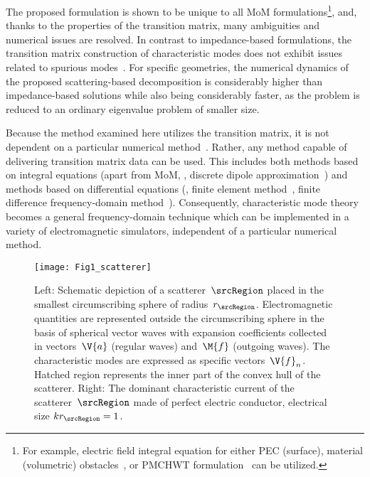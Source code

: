 \documentclass[journal]{IEEEtran}
\providecommand{\aCircum}{r_\srcRegion} %
\begin{document}
The proposed formulation is shown to be unique to all \ac{MoM} formulations\footnote{For example, electric field integral equation for either PEC (surface), material (volumetric) obstacles~\cite{VolakisSertel_IntegralEquationMethodsForElectromagnetics}, or PMCHWT formulation~\cite{1973_Poggio_ComputerTechniquesForElectromagnetics,1977_Wu_RS,ChangHarrington_AsurfaceFormulationForCharacteristicModesOfMaterialBodies} can be utilized.},  and, thanks to the properties of the transition matrix, many ambiguities and numerical issues are resolved. In contrast to impedance-based formulations, the transition matrix construction of characteristic modes does not exhibit issues related to spurious modes~\cite{YlaOijala_PMCHWTBasedCharacteristicModeFormulationsforMaterialBodies}. For specific geometries, the numerical dynamics of the proposed scattering-based decomposition is considerably higher than impedance-based solutions while also being considerably faster, as the problem is reduced to an ordinary eigenvalue problem of smaller size. %

Because the method examined here utilizes the transition matrix, it is not dependent on a particular numerical method~\cite{Mishchenko2020}. Rather, any method capable of delivering transition matrix data can be used. This includes both methods based on integral equations (apart from \ac{MoM}, \eg{}, discrete dipole approximation~\cite{Loke+etal2009}) and methods based on differential equations (\eg{}, finite element method~\cite{Demesy+etal2018,Fruhnert+etal2017}, finite difference frequency-domain method~\cite{Loke+etal2007}). Consequently, characteristic mode theory becomes a general frequency-domain technique which can be implemented in a variety of electromagnetic simulators, independent of a particular numerical method.

\begin{figure}[]
    \centering
    \texttt{[image: Fig1\_scatterer]}
    \caption{Left: Schematic depiction of a scatterer~$\srcRegion$ placed in the smallest circumscribing sphere of radius~$\aCircum$. Electromagnetic quantities are represented outside the circumscribing sphere in the basis of spherical vector waves with expansion coefficients collected in vectors~$\V{a}$ (regular waves) and~$\M{f}$ (outgoing waves). The characteristic modes are expressed as specific vectors~$\V{f}_n$. Hatched region represents the inner part of the convex hull of the scatterer. Right: The dominant characteristic current of the scatterer~$\srcRegion$ made of perfect electric conductor, electrical size $k\aCircum = 1$.}
    \label{fig:scat1}
\end{figure}
\end{document}
